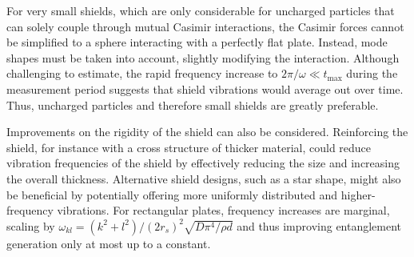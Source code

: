 For very small shields, which are only considerable for uncharged particles that can solely couple through mutual Casimir interactions, the Casimir forces cannot be simplified to a sphere interacting with a perfectly flat plate.
Instead, mode shapes must be taken into account, slightly modifying the interaction.
Although challenging to estimate, the rapid frequency increase to $2\pi/\omega \ll t_\mathrm{max}$ during the measurement period suggests that shield vibrations would average out over time.
Thus, uncharged particles and therefore small shields are greatly preferable.

Improvements on the rigidity of the shield can also be considered. 
Reinforcing the shield, for instance with a cross structure of thicker material, could reduce vibration frequencies of the shield by effectively reducing the size and increasing the overall thickness.
Alternative shield designs, such as a star shape, might also be beneficial by potentially offering more uniformly distributed and higher-frequency vibrations. For rectangular plates, frequency increases are marginal, scaling by $\omega_{kl} = (k^2 + l^2)/(2r_s)^2 \sqrt{D \pi^4 / \rho d}$ \cite[p. 471-474]{Rao_2019} and thus improving entanglement generation only at most up to a constant.